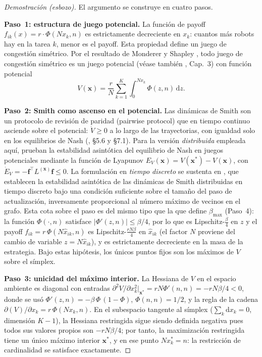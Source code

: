 \begin{proof}[Demostración (esbozo)]
El argumento se construye en cuatro pasos.

\textbf{Paso~1: estructura de juego potencial.}
La función de payoff $f_{ik}(x) = r \cdot \Phi(Nx_k, n)$ es estrictamente
decreciente en $x_k$: cuantos más robots hay en la tarea $k$, menor es el payoff.
Esta propiedad define un juego de congestión simétrico. Por el resultado de
Monderer y Shapley \citep{monderer1996potential}, todo juego de congestión
simétrico es un juego potencial (véase también \citealt{sandholm2010population},
Cap.~3) con función potencial
\[
  V(\mathbf{x}) = \frac{r}{N}\sum_{k=1}^K \int_0^{Nx_k} \Phi(z, n)\,\mathrm{d}z.
\]

\textbf{Paso~2: Smith como ascenso en el potencial.}
Las dinámicas de Smith son un protocolo de revisión de paridad (pairwise protocol)
que en tiempo continuo asciende sobre el potencial: $\dot{V} \geq 0$ a lo largo de
las trayectorias, con igualdad solo en los equilibrios de Nash
(\citealt{sandholm2010population}, \S5.6 y \S7.1). Para la versión \emph{distribuida}
empleada aquí, \citet{barreiro2017distributed} prueban la estabilidad
asintótica del equilibrio de Nash en juegos potenciales mediante la función de
Lyapunov $E_V(\mathbf{x}) = V(\mathbf{x}^*) - V(\mathbf{x})$, con
$\dot{E}_V = -\mathbf{f}^{\top} L^{(\mathbf{x})}\mathbf{f} \leq 0$. La formulación en
\emph{tiempo discreto} se sustenta en \citet{martinez2020formation,
martinezpiazuelo2022tcss}, que establecen la estabilidad asintótica de las dinámicas
de Smith distribuidas en tiempo discreto bajo una condición suficiente sobre el tamaño
del paso de actualización, inversamente proporcional al número máximo de vecinos en el
grafo.
Esta cota sobre el paso
es del mismo tipo que la que define $\beta_{\max}$ (Paso~4): la función $\Phi(\cdot,n)$
satisface $|\Phi'(z,n)| \leq \beta/4$, por lo que es Lipschitz-$\tfrac{\beta}{4}$ en
$z$ y el payoff $f_{ik} = r\,\Phi(N\hat{x}_{ik},n)$ es Lipschitz-$\tfrac{rN\beta}{4}$
en $\hat{x}_{ik}$ (el factor $N$ proviene del cambio de variable $z = N\hat{x}_{ik}$),
y es estrictamente decreciente en la masa de la estrategia. Bajo estas hipótesis,
los únicos puntos fijos son los máximos de $V$ sobre el símplex.

\textbf{Paso~3: unicidad del máximo interior.}
La Hessiana de $V$ en el espacio ambiente es diagonal con entradas
$\partial^2 V / \partial x_k^2|_{\mathbf{x}^*} = r N\Phi'(n,n) = -rN\beta/4 < 0$,
donde se usó $\Phi'(z,n) = -\beta\,\Phi\,(1{-}\Phi)$, $\Phi(n,n) = 1/2$, y la
regla de la cadena $\partial (V)/\partial x_k = r\,\Phi(Nx_k,n)$.
En el subespacio tangente al símplex ($\sum_k \mathrm{d}x_k = 0$, dimensión $K{-}1$),
la Hessiana restringida sigue siendo definida negativa pues todos sus valores propios
son $-rN\beta/4$; por tanto, la maximización restringida tiene un único máximo
interior $\mathbf{x}^*$, y en ese punto $Nx_k^* = n$: la restricción de cardinalidad
se satisface exactamente.


\end{proof}
